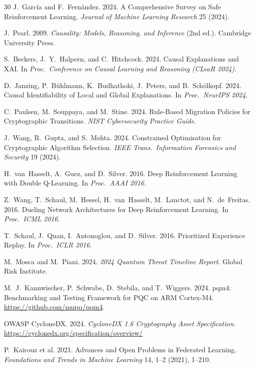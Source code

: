 \documentclass[sigconf,nonacm]{acmart}
\begin{document}
\begin{thebibliography}{30}
J.~Garc\'ia and F.~Fern\'andez. 2024. A Comprehensive Survey on
Safe Reinforcement Learning. \textit{Journal of Machine Learning
Research} 25 (2024).

J.~Pearl. 2009. \textit{Causality: Models, Reasoning, and Inference}
(2nd ed.). Cambridge University Press.

S.~Beckers, J.~Y.~Halpern, and C.~Hitchcock. 2024. Causal Explanations
and XAI. In \textit{Proc.\ Conference on Causal Learning and
Reasoning (CLeaR 2024)}.

D.~Janzing, P.~B\"uhlmann, K.~Budhathoki, J.~Peters, and B.~Sch\"olkopf.
2024. Causal Identifiability of Local and Global Explanations. In
\textit{Proc.\ NeurIPS 2024}.

C.~Paulsen, M.~Souppaya, and M.~Stine. 2024. Rule-Based Migration
Policies for Cryptographic Transitions. \textit{NIST Cybersecurity
Practice Guide}.

J.~Wang, R.~Gupta, and S.~Mehta. 2024. Constrained Optimisation for
Cryptographic Algorithm Selection. \textit{IEEE Trans.\ Information
Forensics and Security} 19 (2024).

H.~van~Hasselt, A.~Guez, and D.~Silver. 2016. Deep Reinforcement
Learning with Double Q-Learning. In \textit{Proc.\ AAAI 2016}.

Z.~Wang, T.~Schaul, M.~Hessel, H.~van~Hasselt, M.~Lanctot, and
N.~de~Freitas. 2016. Dueling Network Architectures for Deep
Reinforcement Learning. In \textit{Proc.\ ICML 2016}.

T.~Schaul, J.~Quan, I.~Antonoglou, and D.~Silver. 2016. Prioritized
Experience Replay. In \textit{Proc.\ ICLR 2016}.

M.~Mosca and M.~Piani. 2024. \textit{2024 Quantum Threat Timeline
Report}. Global Risk Institute.

M.~J.~Kannwischer, P.~Schwabe, D.~Stebila, and T.~Wiggers. 2024.
pqm4: Benchmarking and Testing Framework for PQC on ARM Cortex-M4.
\url{https://github.com/mupq/pqm4}.

OWASP CycloneDX. 2024. \textit{CycloneDX 1.6 Cryptography Asset
Specification}. \url{https://cyclonedx.org/specification/overview/}

P.~Kairouz et al. 2021. Advances and Open Problems in Federated
Learning. \textit{Foundations and Trends in Machine Learning} 14, 1--2
(2021), 1--210.


\end{thebibliography}
\end{document}
